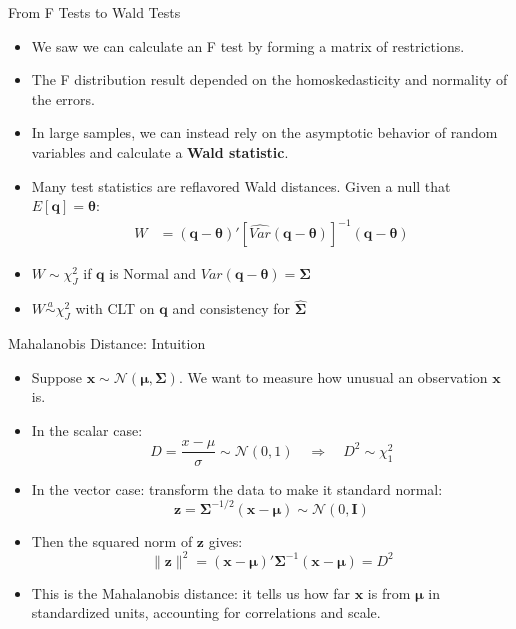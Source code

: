 \documentclass[aspectratio=169, handout, t]{beamer}
\numberwithin{equation}{section}
\begin{document}
\begin{frame}{From F Tests to Wald Tests}
\begin{itemize}
\item We saw we can calculate an F test by forming a matrix of restrictions.
\item The F distribution result depended on the homoskedasticity and normality of the errors.
\item In large samples, we can instead rely on the asymptotic behavior of random variables and calculate a \textbf{Wald statistic}.
\end{itemize}

\pause

\begin{itemize}
\item Many test statistics are reflavored Wald distances. Given a null that $E[\bm{q}]=\bm{\theta}$:
\begin{align*}
W &= (\bm{q}-\bm{\theta})'[\widehat{Var}(\bm{q}-\bm{\theta})]^{-1}(\bm{q}-\bm{\theta})
\end{align*}
\item $W \sim\chi^2_J$ if $\bm{q}$ is Normal and $Var(\bm{q}-\bm{\theta})=\bm{\Sigma}$
\item $W \overset{a}{\sim}\chi^2_J$ with CLT on $\bm{q}$ and consistency for $\hat{\bm{\Sigma}}$
\end{itemize}
\end{frame}


\begin{frame}{Mahalanobis Distance: Intuition}
\begin{itemize}
\item Suppose $\bm{x} \sim \mathcal{N}(\bm{\mu}, \bm{\Sigma})$. We want to measure how unusual an observation $\bm{x}$ is.

\item In the scalar case:
\[
D = \frac{x - \mu}{\sigma} \sim \mathcal{N}(0,1) \quad \Rightarrow \quad D^2 \sim \chi^2_1
\]

\item In the vector case: transform the data to make it standard normal:
\[
\bm{z} = \bm{\Sigma}^{-1/2} (\bm{x} - \bm{\mu}) \sim \mathcal{N}(0, \bm{I})
\]

\item Then the squared norm of $\bm{z}$ gives:
\[
\|\bm{z}\|^2 = (\bm{x} - \bm{\mu})' \bm{\Sigma}^{-1} (\bm{x} - \bm{\mu}) = D^2
\]

\item This is the Mahalanobis distance: it tells us how far $\bm{x}$ is from $\bm{\mu}$ in standardized units, accounting for correlations and scale.
\end{itemize}
\end{frame}
\end{document}
